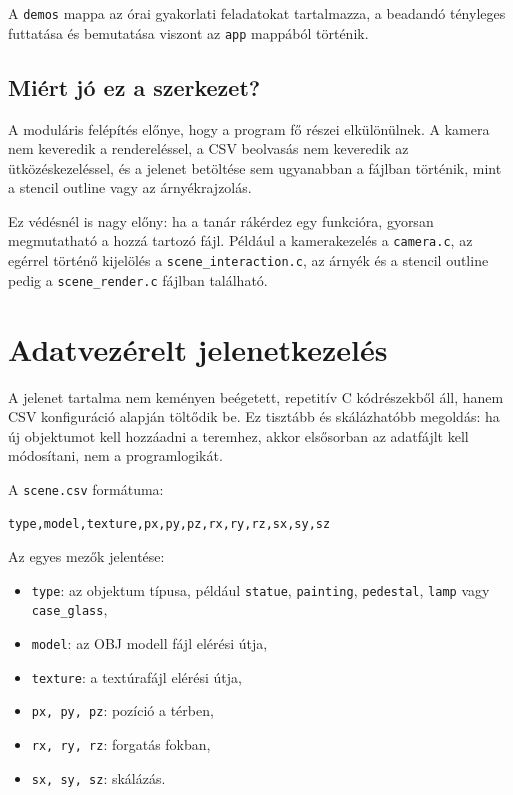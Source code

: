 \documentclass[12pt,a4paper]{article}
\newcommand{\code}[1]{\texttt{#1}}
\begin{document}
A \code{demos} mappa az órai gyakorlati feladatokat tartalmazza, a beadandó tényleges futtatása és bemutatása viszont az \code{app} mappából történik.

\subsection{Miért jó ez a szerkezet?}

A moduláris felépítés előnye, hogy a program fő részei elkülönülnek. A kamera nem keveredik a rendereléssel, a CSV beolvasás nem keveredik az ütközéskezeléssel, és a jelenet betöltése sem ugyanabban a fájlban történik, mint a stencil outline vagy az árnyékrajzolás.

Ez védésnél is nagy előny: ha a tanár rákérdez egy funkcióra, gyorsan megmutatható a hozzá tartozó fájl. Például a kamerakezelés a \code{camera.c}, az egérrel történő kijelölés a \code{scene\_interaction.c}, az árnyék és a stencil outline pedig a \code{scene\_render.c} fájlban található.

\section{Adatvezérelt jelenetkezelés}

A jelenet tartalma nem keményen beégetett, repetitív C kódrészekből áll, hanem CSV konfiguráció alapján töltődik be. Ez tisztább és skálázhatóbb megoldás: ha új objektumot kell hozzáadni a teremhez, akkor elsősorban az adatfájlt kell módosítani, nem a programlogikát.

A \code{scene.csv} formátuma:

\begin{verbatim}
type,model,texture,px,py,pz,rx,ry,rz,sx,sy,sz
\end{verbatim}

Az egyes mezők jelentése:

\begin{itemize}
    \item \code{type}: az objektum típusa, például \code{statue}, \code{painting}, \code{pedestal}, \code{lamp} vagy \code{case\_glass},
    \item \code{model}: az OBJ modell fájl elérési útja,
    \item \code{texture}: a textúrafájl elérési útja,
    \item \code{px, py, pz}: pozíció a térben,
    \item \code{rx, ry, rz}: forgatás fokban,
    \item \code{sx, sy, sz}: skálázás.
\end{itemize}
\end{document}
